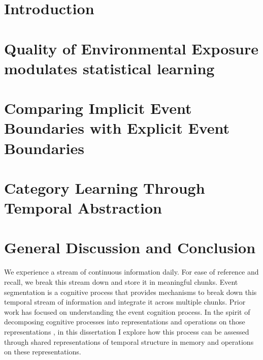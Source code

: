 
\mainmatter   %


\chapter{Introduction}
\label{introduction}


\newpage

\chapter{Quality of Environmental Exposure modulates statistical learning}
\label{chapter-2-walk-lengths-modulate-statistical-learning}


\newpage
\chapter{Comparing Implicit Event Boundaries with Explicit Event Boundaries}
\label{chapter-3-implicit-explicit-event-boundaries}


\chapter{Category Learning Through Temporal Abstraction}
\label{chapter-4-category-learning-through-temporal-abstraction}


\chapter{General Discussion and Conclusion}
We experience a stream of continuous information daily. For ease of reference and recall, we break this stream down and store it in meaningful chunks. Event segmentation is a cognitive process that provides mechanisms to break down this temporal stream of information and integrate it across multiple chunks. Prior work has focused on understanding the event cognition process. In the spirit of decomposing cognitive processes into representations and operations on those representations \cite{cowell2019roadmap}, in this dissertation I explore how this process can be assessed through shared representations of temporal structure in memory and operations on these representations. 

